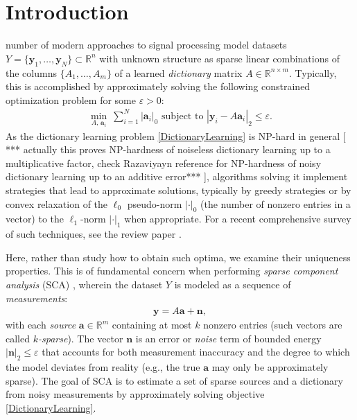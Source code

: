 \documentclass[journal, onecolumn]{IEEEtran}
\begin{document}
\section{Introduction}
 number of modern approaches to signal processing model datasets $Y = \{\mathbf{y}_1, \ldots, \mathbf{y}_N\} \subset \mathbb{R}^n$ with unknown structure as sparse linear combinations of the columns $\{A_1,\ldots,A_m\}$ of a learned \textit{dictionary} matrix $A \in \mathbb R^{n\times m}$.  Typically, this is accomplished by approximately solving the following constrained optimization problem for some $\varepsilon > 0$:
\begin{align}\label{DictionaryLearning}
\min_{A, \, \mathbf{a}_i} \  \sum_{i=1}^N |\mathbf{a}_i|_0 \text{ subject to } |\mathbf{y}_i - A\mathbf{a}_i|_2 \leq \varepsilon.
\end{align}
As the dictionary learning problem \eqref{DictionaryLearning} is NP-hard in general \cite{Tillmann15} [ *** actually this proves NP-hardness of noiseless dictionary learning up to a multiplicative factor, check Razaviyayn reference for NP-hardness of noisy dictionary learning up to an additive error*** ], algorithms solving it implement strategies that lead to approximate solutions, typically by greedy strategies or by convex relaxation of the $\ell_0$ pseudo-norm $|\cdot|_0$ (the number of nonzero entries in a vector) to the $\ell_1$-norm $|\cdot|_1$ when appropriate. For a recent comprehensive survey of such techniques, see the review paper \cite{Zhang15}.

Here, rather than study how to obtain such optima, we examine their uniqueness properties. This is of fundamental concern when performing \emph{sparse component analysis} (SCA) \cite{Georgiev05}, wherein the dataset $Y$ is modeled as a sequence of \emph{measurements}:
\begin{align}\label{LinearModel}
\mathbf{y} = A\mathbf{a} + \mathbf{n},
\end{align}
with each \textit{source} $\mathbf{a} \in \mathbb R^m$ containing at most $k$ nonzero entries (such vectors are called \emph{$k$-sparse}).
The vector $\mathbf{n}$ is an error or \textit{noise} term of bounded energy $|\mathbf{n}|_2 \leq \varepsilon$ that accounts for both measurement inaccuracy and the degree to which the model deviates from reality (e.g., the true $\mathbf{a}$ may only be approximately sparse).  The goal of SCA is to estimate a set of sparse sources and a dictionary from noisy measurements by approximately solving objective \eqref{DictionaryLearning}.
\end{document}
